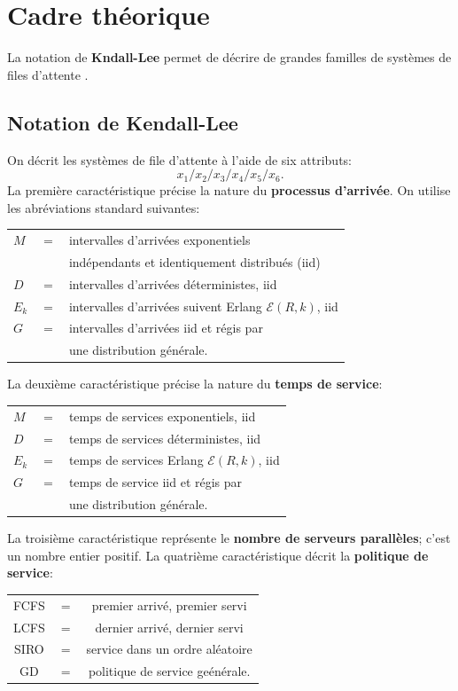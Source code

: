 
\section{Cadre th\'eorique}
La notation de \textbf{Kndall-Lee} permet de décrire de grandes familles de systèmes de files d'attente \cite{QS_K}.
\subsection{Notation de Kendall-Lee}
On d\'ecrit les syst\`emes de file d'attente \`a l'aide de  six attributs: $$x_1/x_2/x_3/x_4/x_5/x_6.$$
La première caractéristique précise la nature du \textbf{processus d'arrivée}. On utilise les abréviations standard suivantes:
\newl \begin{tabular}{p{0.25cm}p{0.25cm}p{15cm}}
$M$ &$=$& intervalles d’arrivées exponentiels \\ & & \quad   indépendants et identiquement distribués (iid) \\
$D$ &$=$& intervalles d’arrivées d\'eterministes, iid\\
$E_{k}$ &$=$& intervalles d’arrivées suivent Erlang $\mathcal{E}(R,k)$, iid  \\
$G$ &$=$& intervalles d’arrivées iid et r\'egis par  \\ & & \quad une distribution g\'en\'erale.
\end{tabular}
\newl
La deuxième caractéristique précise la nature du \textbf{temps de service}:
\newline \newline
\begin{tabular}{p{0.25cm}p{}p{12cm}}
$M$ &$=$& temps de services exponentiels, iid \\
$D$ &$=$& temps de services d\'eterministes, iid\\
$E_{k}$ &$=$& temps de services Erlang $\mathcal{E}(R,k)$, iid \\
$G$ &$=$& temps de service iid et r\'egis par  \\ & & \quad une distribution g\'en\'erale.
\end{tabular}
\newpage\noindent
La troisième caractéristique représente le \textbf{nombre de ser\-veurs parallèles}; c'est un nombre entier positif. \newl  La quatrième caractéristique décrit la \textbf{politique de service}:
\newl
\begin{tabular}{ccc}
FCFS &$=$& premier arriv\'e, premier servi\\
LCFS &$=$& dernier arriv\'e, dernier servi\\
SIRO &$=$& service dans un ordre al\'eatoire\\
GD &$=$& politique de service ge\'en\'erale.
\end{tabular}
